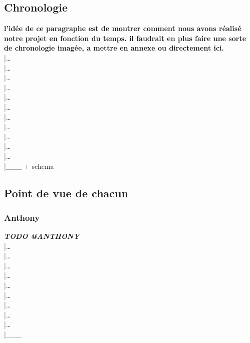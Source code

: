 \documentclass[12pt,a4paper]{article}
\begin{document}
        \subsection{Chronologie}
            \textbf{l'idée de ce paragraphe est de montrer comment nous avons réalisé notre projet en 
            fonction du temps. il faudrait en plus faire une sorte de chronologie imagée, a mettre en 
            annexe ou directement ici.}\\
            |\dots\\|\dots\\|\dots\\|\dots\\|\dots\\|\dots\\|\dots\\|\dots\\|\dots\\|\dots\\|\dots\\
            |\_\_\_ + schema

        \subsection{Point de vue de chacun}
            \subsubsection{Anthony}
                \textit{\bfseries TODO @ANTHONY}\\
                |\dots\\|\dots\\|\dots\\|\dots\\|\dots\\|\dots\\|\dots\\|\dots\\|\dots\\|\_\_\_\\
\end{document}
